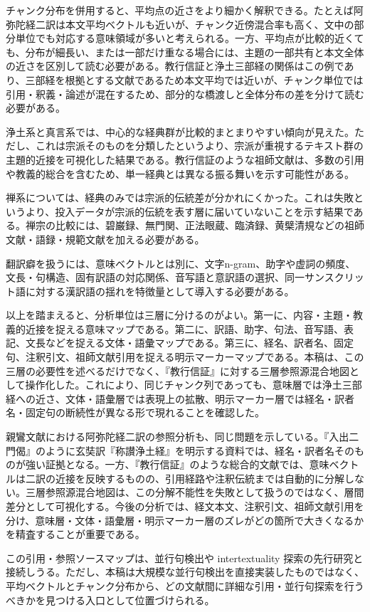 \documentclass[uplatex,dvipdfmx,11pt,a4paper]{jsarticle}
\begin{document}
チャンク分布を併用すると、平均点の近さをより細かく解釈できる。たとえば阿弥陀経二訳は本文平均ベクトルも近いが、チャンク近傍混合率も高く、文中の部分単位でも対応する意味領域が多いと考えられる。一方、平均点が比較的近くても、分布が細長い、または一部だけ重なる場合には、主題の一部共有と本文全体の近さを区別して読む必要がある。教行信証と浄土三部経の関係はこの例であり、三部経を根拠とする文献であるため本文平均では近いが、チャンク単位では引用・釈義・論述が混在するため、部分的な橋渡しと全体分布の差を分けて読む必要がある。

浄土系と真言系では、中心的な経典群が比較的まとまりやすい傾向が見えた。ただし、これは宗派そのものを分類したというより、宗派が重視するテキスト群の主題的近接を可視化した結果である。教行信証のような祖師文献は、多数の引用や教義的総合を含むため、単一経典とは異なる振る舞いを示す可能性がある。

禅系については、経典のみでは宗派的伝統差が分かれにくかった。これは失敗というより、投入データが宗派的伝統を表す層に届いていないことを示す結果である。禅宗の比較には、碧巌録、無門関、正法眼蔵、臨済録、黄檗清規などの祖師文献・語録・規範文献を加える必要がある。

翻訳癖を扱うには、意味ベクトルとは別に、文字n-gram、助字や虚詞の頻度、文長・句構造、固有訳語の対応関係、音写語と意訳語の選択、同一サンスクリット語に対する漢訳語の揺れを特徴量として導入する必要がある。

以上を踏まえると、分析単位は三層に分けるのがよい。第一に、内容・主題・教義的近接を捉える意味マップである。第二に、訳語、助字、句法、音写語、表記、文長などを捉える文体・語彙マップである。第三に、経名、訳者名、固定句、注釈引文、祖師文献引用を捉える明示マーカーマップである。本稿は、この三層の必要性を述べるだけでなく、『教行信証』に対する三層参照源混合地図として操作化した。これにより、同じチャンク列であっても、意味層では浄土三部経への近さ、文体・語彙層では表現上の拡散、明示マーカー層では経名・訳者名・固定句の断続性が異なる形で現れることを確認した。

親鸞文献における阿弥陀経二訳の参照分析も、同じ問題を示している。『入出二門偈』のように玄奘訳『称讃浄土経』を明示する資料では、経名・訳者名そのものが強い証拠となる。一方、『教行信証』のような総合的文献では、意味ベクトルは二訳の近接を反映するものの、引用経路や注釈伝統までは自動的に分解しない。三層参照源混合地図は、この分解不能性を失敗として扱うのではなく、層間差分として可視化する。今後の分析では、経文本文、注釈引文、祖師文献引用を分け、意味層・文体・語彙層・明示マーカー層のズレがどの箇所で大きくなるかを精査することが重要である。

この引用・参照ソースマップは、並行句検出や intertextuality 探索の先行研究\cite{nehrdich2020,dharmanexus}と接続しうる。ただし、本稿は大規模な並行句検出を直接実装したものではなく、平均ベクトルとチャンク分布から、どの文献間に詳細な引用・並行句探索を行うべきかを見つける入口として位置づけられる。
\end{document}
